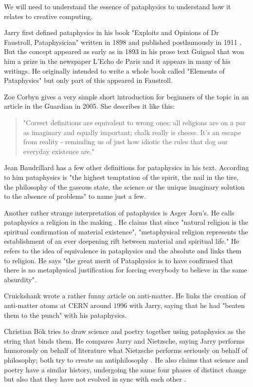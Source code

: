 We will need to understand the essence of pataphysics to understand how it relates to creative computing.

Jarry first defined pataphysics in his book "Exploits and Opinions of Dr Faustroll, Pataphysician" written in 1898 and published posthumously in 1911 \citep{Jarry1996}. But the concept appeared as early as in 1893 in his prose text Guignol that won him a prize in the newspaper L'Echo de Paris and it appears in many of his writings. He originally intended to write a whole book called "Elements of Pataphysics" but only part of this appeared in Faustroll.

Zoe Corbyn gives a very simple short introduction for beginners of the topic in an article in the Guardian \citep{Corbyn2005} in 2005. She describes it like this:

\begin{quote}
  "Correct definitions are equivalent to wrong ones; all religions are on a par as imaginary and equally important; chalk really is cheese. It's an escape from reality - reminding us of just how idiotic the rules that dog our everyday existence are." \citep{Jarry1996}
\end{quote}

Jean Baudrillard has a few other definitions for pataphysics in his text\citep{Baudrillard2007}. According to him pataphysics is "the highest temptation of the spirit, the nail in the tire, the philosophy of the gaseous state, the science or the unique imaginary solution to the absence of problems" to name just a few.

Another rather strange interpretation of pataphysics is Asger Jorn's. He calls pataphysics a religion in the making \citep{Jorn1961}. He claims that since "natural religion is the spiritual confirmation of material existence", "metaphysical religion represents the establishment of an ever deepening rift between material and spiritual life." He refers to the idea of equivalence in pataphysics and the absolute and links them to religion. He says "the great merit of Pataphysics is to have confirmed that there is no metaphysical justification for forcing everybody to believe in the same absurdity".

Cruickshank \citep{Cruickshank} wrote a rather funny article on anti-matter. He links the creation of anti-matter atoms at CERN around 1996 with Jarry, saying that he had "beaten them to the punch" with his pataphysics.

Christian Bök \citep{Bok2002} tries to draw science and poetry together using pataphysics as the string that binds them. He compares Jarry and Nietzsche, saying Jarry performs humorously on behalf of literature what Nietzsche performs seriously on behalf of philosophy; both try to create an antiphilosophy \citep[p.9]{Bok2002}. He also claims that science and poetry have a similar history, undergoing the same four phases of distinct change but also that they have not evolved in sync with each other \citep[p.15]{Bok2002}.

